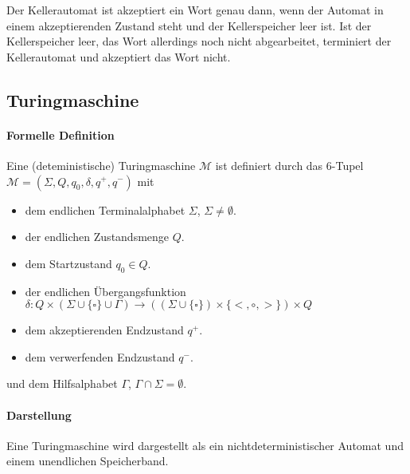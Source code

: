 \documentclass[a4paper, 11pt, accentcolor = tud3b]{tudreport}
\begin{document}
                Der Kellerautomat ist akzeptiert ein Wort genau dann, wenn der Automat in einem akzeptierenden Zustand steht und der Kellerspeicher leer ist. Ist der Kellerspeicher leer, das Wort allerdings noch nicht abgearbeitet, terminiert der Kellerautomat und akzeptiert das Wort nicht.


        \subsection{Turingmaschine}
            \paragraph{Formelle Definition}
                Eine (deteministische) Turingmaschine $ \mathcal{M} $ ist definiert durch das 6-Tupel $ \mathcal{M} = (\Sigma, Q, q _ 0, \delta, q ^ +, q ^ -) $ mit
                \begin{itemize}
                    \item dem endlichen Terminalalphabet $ \Sigma $, $ \Sigma \neq \emptyset $.
                    \item der endlichen Zustandsmenge $ Q $.
                    \item dem Startzustand $ q _ 0 \in Q $.
                    \item der endlichen Übergangsfunktion $ \delta : Q \times (\Sigma \cup \{ \square \} \cup \Gamma) \rightarrow ((\Sigma \cup \{ \square \}) \times \{ <, \circ, > \}) \times Q $
                    \item dem akzeptierenden Endzustand $ q ^ + $.
                    \item dem verwerfenden Endzustand $ q ^ - $.
                \end{itemize}
                und dem Hilfsalphabet $ \Gamma $, $ \Gamma \cap \Sigma = \emptyset $.

            \paragraph{Darstellung}
                Eine Turingmaschine wird dargestellt als ein nichtdeterministischer Automat und einem unendlichen Speicherband.
\end{document}
